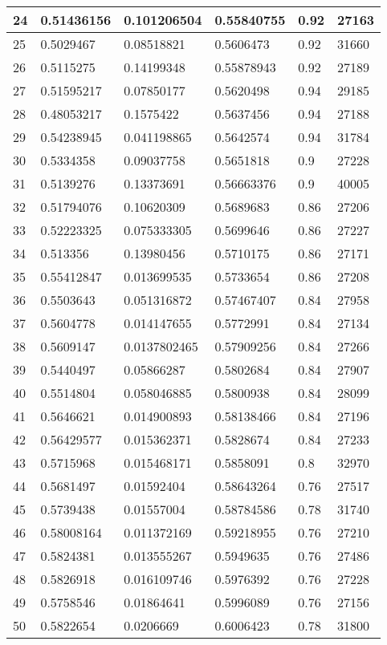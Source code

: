 \begin{longtable}{|l|l|l|l|l|l|}
24 & 0.51436156 & 0.101206504 & 0.55840755 & 0.92 & 27163 \\ \hline 
25 & 0.5029467 & 0.08518821 & 0.5606473 & 0.92 & 31660 \\ \hline 
26 & 0.5115275 & 0.14199348 & 0.55878943 & 0.92 & 27189 \\ \hline 
27 & 0.51595217 & 0.07850177 & 0.5620498 & 0.94 & 29185 \\ \hline 
28 & 0.48053217 & 0.1575422 & 0.5637456 & 0.94 & 27188 \\ \hline 
29 & 0.54238945 & 0.041198865 & 0.5642574 & 0.94 & 31784 \\ \hline 
30 & 0.5334358 & 0.09037758 & 0.5651818 & 0.9 & 27228 \\ \hline 
31 & 0.5139276 & 0.13373691 & 0.56663376 & 0.9 & 40005 \\ \hline 
32 & 0.51794076 & 0.10620309 & 0.5689683 & 0.86 & 27206 \\ \hline 
33 & 0.52223325 & 0.075333305 & 0.5699646 & 0.86 & 27227 \\ \hline 
34 & 0.513356 & 0.13980456 & 0.5710175 & 0.86 & 27171 \\ \hline 
35 & 0.55412847 & 0.013699535 & 0.5733654 & 0.86 & 27208 \\ \hline 
36 & 0.5503643 & 0.051316872 & 0.57467407 & 0.84 & 27958 \\ \hline 
37 & 0.5604778 & 0.014147655 & 0.5772991 & 0.84 & 27134 \\ \hline 
38 & 0.5609147 & 0.0137802465 & 0.57909256 & 0.84 & 27266 \\ \hline 
39 & 0.5440497 & 0.05866287 & 0.5802684 & 0.84 & 27907 \\ \hline 
40 & 0.5514804 & 0.058046885 & 0.5800938 & 0.84 & 28099 \\ \hline 
41 & 0.5646621 & 0.014900893 & 0.58138466 & 0.84 & 27196 \\ \hline 
42 & 0.56429577 & 0.015362371 & 0.5828674 & 0.84 & 27233 \\ \hline 
43 & 0.5715968 & 0.015468171 & 0.5858091 & 0.8 & 32970 \\ \hline 
44 & 0.5681497 & 0.01592404 & 0.58643264 & 0.76 & 27517 \\ \hline 
45 & 0.5739438 & 0.01557004 & 0.58784586 & 0.78 & 31740 \\ \hline 
46 & 0.58008164 & 0.011372169 & 0.59218955 & 0.76 & 27210 \\ \hline 
47 & 0.5824381 & 0.013555267 & 0.5949635 & 0.76 & 27486 \\ \hline 
48 & 0.5826918 & 0.016109746 & 0.5976392 & 0.76 & 27228 \\ \hline 
49 & 0.5758546 & 0.01864641 & 0.5996089 & 0.76 & 27156 \\ \hline 
50 & 0.5822654 & 0.0206669 & 0.6006423 & 0.78 & 31800 \\ \hline 
\end{longtable}